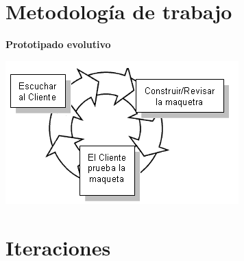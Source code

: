 \section{Metodología de trabajo}

\begin{slide}
  \begin{block}{\textbf{Prototipado evolutivo}}
    \begin{center}
      \includegraphics[height=0.5\textheight]{img/prototipo.png}
    \end{center}
  \end{block}
\end{slide}

\section{Iteraciones}

